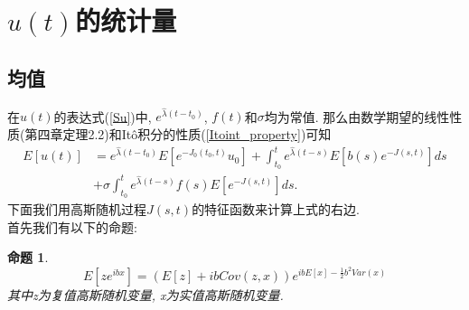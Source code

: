 \documentclass[notitlepage,cs4size,punct,oneside]{ctexrep}
\numberwithin{equation}{section}
\theoremstyle{mystyle}
\newtheorem{proposition}[definition]{\hspace{2em}命题}
\begin{document}
\section{$u(t)$的统计量}
\subsection{均值}
在$u(t)$的表达式(\ref{Su})中, $e^{\hat{\lambda}(t-t_0)}$, $f(t)$和$\sigma$均为常值. 那么由数学期望的线性性质(\cite{shuyuanhe2006probability}第四章定理2.2)和It\^{o}积分的性质(\ref{Itoint_property})可知
\begin{equation} \label{u_stat_1}
\begin{split}
E[u(t)] &= e^{\hat{\lambda}(t-t_0)}E\left[e^{-J_0(t_0, t)}u_0\right] + \int_{t_0}^t e^{\hat{\lambda}(t-s)}E\left[b(s)e^{-J(s, t)}\right]ds  \\
&+ \sigma\int_{t_0}^{t} e^{\hat{\lambda}(t-s)}f(s)E\left[e^{-J(s, t)}\right]ds.
\end{split}
\end{equation}
下面我们用高斯随机过程$J(s, t)$的特征函数\cite{gershgorin2008nonlinear}\cite{gershgorin2010filtering}来计算上式的右边. \\
首先我们有以下的命题:
\begin{proposition} \label{multiVariable gaussian exp 1}
$$E\left[ze^{ibx}\right] = (E[z]+ibCov(z, x))e^{ibE[x]-\frac{1}{2}b^2Var(x)}$$
其中z为复值高斯随机变量, x为实值高斯随机变量. 
\end{proposition}
\end{document}
